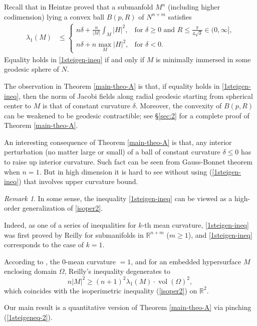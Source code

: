 \documentclass{amsart}
\numberwithin{equation}{section}
\theoremstyle{remark}
\newtheorem{rem}[theo]{Remark}
\renewcommand{\(}{\left(}
\renewcommand{\)}{\right)}
\renewcommand{\~}{\tilde}
\renewcommand{\-}{\overline}
\renewcommand{\d}{\delta}
\renewcommand{\l}{\lambda}
\begin{document}
Recall that in \cite[Theorem 2.1]{Heintze1988} Heintze proved that a submanfold $M^n$ (including higher codimension) lying a convex ball $B(p,R)$ of $N^{n+m}$ satisfies
\begin{align}\label{1steigen-ineq}
\l_1(M)&\leq \begin{cases}
n\d+\frac{n}{|M|}\int_{M}|H|^2, &\text{for $\d\geq 0$ and $R\le\frac{\pi}{4\sqrt{\d}}\in (0,\infty]$,}\\
n\d+n\max_{M}|H|^2, &\text{for $\d<0$.}
\end{cases}
\end{align}
Equality holds in \eqref{1steigen-ineq} if and only if $M$ is minimally immersed in some geodesic sphere of $N$.

The observation in Theorem \ref{main-theo-A} is that, if equality holds in \eqref{1steigen-ineq}, then the norm of Jacobi fields along radial geodesic starting from spherical center to $M$ is that of constant curvature $\d$. Moreover, the convexity of $B(p,R)$ can be weakened to be geodesic contractible; see \S \ref{sec:2} for a complete proof of Theorem \ref{main-theo-A}.

An interesting consequence of Theorem \ref{main-theo-A} is that, any interior perturbation (no matter large or small) of a ball of constant curvature $\d\le 0$  has to raise up interior curvature. Such fact can be seen from Gauss-Bonnet theorem when $n=1$. But in high dimension it is hard to see without using (\ref{1steigen-ineq}) that involves upper curvature bound.



\begin{rem}
	In some sense, the inequality \eqref{1steigen-ineq} can be viewed as a high-order generalization of \eqref{isoper2}.
	
	Indeed, as one of a series of inequalities for $k$-th mean curvature, \eqref{1steigen-ineq} was first proved by Reilly \cite{Reilly1977} for submanifolds in $\mathbb{R}^{n+m}$ ($m\ge 1$), and \eqref{1steigen-ineq} corresponds to the case of $k=1$.
	
	According to \cite[Corollaries 1, 2]{Reilly1977}, the $0$-mean curvature $=1$, and for an embedded hypersurface $M$ enclosing domain $\Omega$, Reilly's inequality degenerates to $$n |M|^2\ge (n+1)^2  \lambda_1(M) \cdot \operatorname{vol}(\Omega)^2,$$ which coincides with the isoperimetric inequality (\ref{isoper2}) on $\mathbb R^2$.
\end{rem}

Our main result is a quantitative version of Theorem \ref{main-theo-A} via pinching (\ref{1steigeneq-2}).
\end{document}
